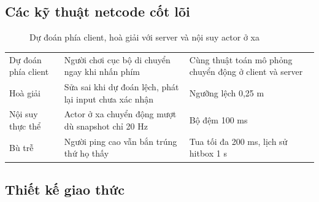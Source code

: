 \subsection{Các kỹ thuật netcode cốt lõi}
\begin{figure}[H]
\centering
{}
\caption{Dự đoán phía client, hoà giải với server và nội suy actor ở xa}
\label{fig:n-netcode}
\end{figure}

\begin{center}\small
\begin{tabularx}{\linewidth}{|L{4cm}|Y|L{4.2cm}|}
\hline
{} &  &  \\ \hline
Dự đoán phía client & Người chơi cục bộ di chuyển ngay khi nhấn phím & Cùng thuật toán mô phỏng chuyển động ở client và server \\ \hline
Hoà giải & Sửa sai khi dự đoán lệch, phát lại input chưa xác nhận & Ngưỡng lệch 0,25 m \\ \hline
Nội suy thực thể & Actor ở xa chuyển động mượt dù snapshot chỉ 20 Hz & Bộ đệm 100 ms \\ \hline
Bù trễ & Người ping cao vẫn bắn trúng thứ họ thấy & Tua tối đa 200 ms, lịch sử hitbox 1 s \\ \hline
\end{tabularx}
\end{center}

\subsection{Thiết kế giao thức}

